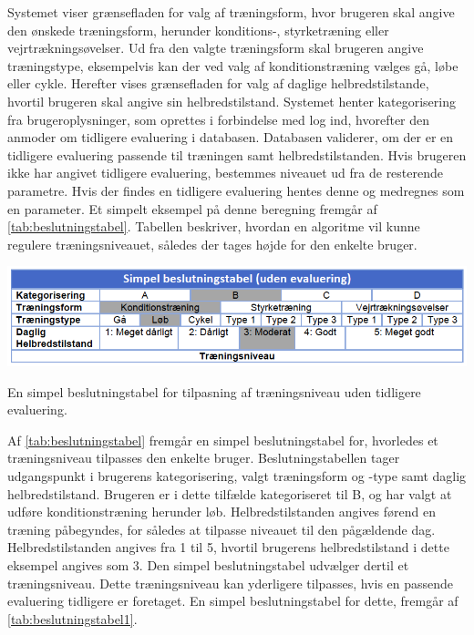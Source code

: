 \noindent
Systemet viser grænsefladen for valg af træningsform, hvor brugeren skal angive den ønskede træningsform, herunder konditions-, styrketræning eller vejrtrækningsøvelser. Ud fra den valgte træningsform skal brugeren angive træningstype, eksempelvis kan der ved valg af konditionstræning vælges gå, løbe eller cykle. Herefter vises grænsefladen for valg af daglige helbredstilstande, hvortil brugeren skal angive sin helbredstilstand. Systemet henter kategorisering fra brugeroplysninger, som oprettes i forbindelse med log ind, hvorefter den anmoder om tidligere evaluering i databasen. Databasen validerer, om der er en tidligere evaluering passende til træningen samt helbredstilstanden. Hvis brugeren ikke har angivet tidligere evaluering, bestemmes niveauet ud fra de resterende parametre. Hvis der findes en tidligere evaluering hentes denne og medregnes som en parameter. Et simpelt eksempel på denne beregning fremgår af \autoref{tab:beslutningstabel}. Tabellen beskriver, hvordan en algoritme vil kunne regulere træningsniveauet, således der tages højde for den enkelte bruger.

\begin{table}[H]
\centering
\includegraphics[width=1\textwidth]{figures/aktivitetsdiagram/beslutningstabel}
\caption{En simpel beslutningstabel for tilpasning af træningsniveau uden tidligere evaluering.}
\label{tab:beslutningstabel}
\end{table} 

\noindent
Af \autoref{tab:beslutningstabel} fremgår en simpel beslutningstabel for, hvorledes et træningsniveau tilpasses den enkelte bruger. Beslutningstabellen tager udgangspunkt i brugerens kategorisering, valgt træningsform og -type samt daglig helbredstilstand. Brugeren er i dette tilfælde kategoriseret til B, og har valgt at udføre konditionstræning herunder løb. Helbredstilstanden angives førend en træning påbegyndes, for således at tilpasse niveauet til den pågældende dag. Helbredstilstanden angives fra 1 til 5, hvortil brugerens helbredstilstand i dette eksempel angives som 3. Den simpel beslutningstabel udvælger dertil et træningsniveau. Dette træningsniveau kan yderligere tilpasses, hvis en passende evaluering tidligere er foretaget. En simpel beslutningstabel for dette, fremgår af \autoref{tab:beslutningstabel1}.

